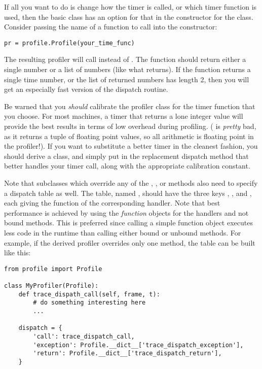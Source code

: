 If all you want to do is change how the timer is called, or which
timer function is used, then the basic class has an option for that in
the constructor for the class.  Consider passing the name of a
function to call into the constructor:

\begin{verbatim}
pr = profile.Profile(your_time_func)
\end{verbatim}

The resulting profiler will call  instead of
.  The function should return either a single number
or a list of numbers (like what  returns).  If the
function returns a single time number, or the list of returned numbers
has length 2, then you will get an especially fast version of the
dispatch routine.

Be warned that you \emph{should} calibrate the profiler class for the
timer function that you choose.  For most machines, a timer that
returns a lone integer value will provide the best results in terms of
low overhead during profiling.  ( is
\emph{pretty} bad, as it returns a tuple of floating point values,
so all arithmetic is floating point in the profiler!).  If you want to
substitute a better timer in the cleanest fashion, you should derive a
class, and simply put in the replacement dispatch method that better
handles your timer call, along with the appropriate calibration
constant.

Note that subclasses which override any of the
, ,
or  methods also need to specify a
dispatch table as well.  The table, named , should
have the three keys , , and
, each giving the function of the corresponding
handler.  Note that best performance is achieved by using the
\emph{function} objects for the handlers and not bound methods.  This
is preferred since calling a simple function object executes less code
in the runtime than calling either bound or unbound methods.  For
example, if the derived profiler overrides only one method, the
 table can be built like this:

\begin{verbatim}
from profile import Profile

class MyProfiler(Profile):
    def trace_dispath_call(self, frame, t):
        # do something interesting here
        ...

    dispatch = {
        'call': trace_dispatch_call,
        'exception': Profile.__dict__['trace_dispatch_exception'],
        'return': Profile.__dict__['trace_dispatch_return'],
    }
\end{verbatim}


